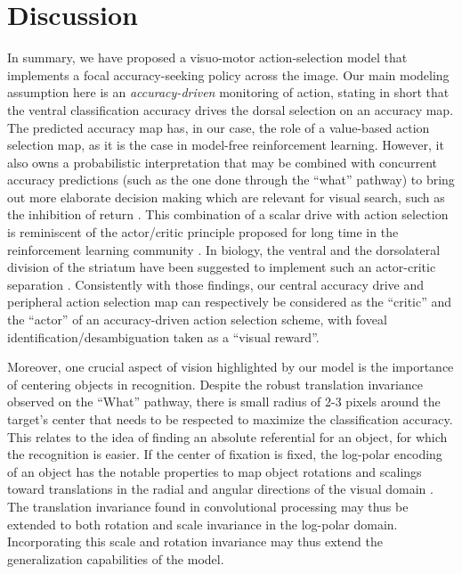 
\section*{Discussion} \label{sec:discussion}

In summary, we have proposed a visuo-motor action-selection model that implements a focal accuracy-seeking policy across the image. 
Our main modeling assumption here is an \emph{accuracy-driven} monitoring of action, stating in short that the ventral classification accuracy drives the dorsal selection on an accuracy map. 
The predicted accuracy map has, in our case, the role of a value-based action selection map, as it is the case in model-free reinforcement learning. However, it also owns a probabilistic interpretation that may be combined with concurrent accuracy predictions (such as the one done through the ``what'' pathway) to bring out more elaborate decision making which are relevant for visual search, such as the inhibition of return \cite{Itti01}. This combination of a scalar drive with action selection is reminiscent of the actor/critic principle proposed for long time in the reinforcement learning community \cite{sutton1998reinforcement}. In biology, the ventral and the dorsolateral division of the striatum have been suggested to implement such an actor-critic separation \cite{joel2002actor,takahashi2008silencing}. Consistently with those findings, our central accuracy drive and peripheral action selection map can respectively be considered as the ``critic'' and the ``actor'' of an accuracy-driven action selection scheme, with foveal identification/desambiguation taken as a ``visual reward''.

Moreover, one crucial aspect of vision highlighted by our model is the importance of centering objects in recognition. Despite the robust translation invariance observed on the ``What'' pathway, there is small radius of 2-3 pixels around the target's center that needs to be respected to maximize the classification accuracy. This relates to the idea of finding an absolute referential for an object, for which the recognition is easier. If the center of fixation is fixed, the log-polar encoding of an object has the notable properties to map object rotations and scalings toward translations in the radial and angular directions of the visual domain \cite{Traver10}. The translation invariance found in convolutional processing may thus be extended to both rotation and scale invariance in the log-polar domain. Incorporating this scale and rotation invariance may thus extend the generalization capabilities of the model.



